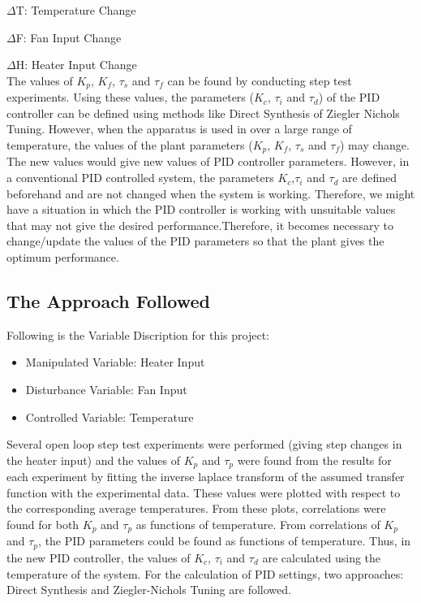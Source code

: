 $\Delta$T: Temperature Change

$\Delta$F: Fan Input Change

$\Delta$H: Heater Input Change\\

The values of $K_p$, $K_f$, $\tau_s$ and $\tau_f$ can be found by conducting step test experiments. Using these values, the parameters ($K_c$,  $\tau_i$ and  $\tau_d$) of the PID controller can be defined using methods like Direct Synthesis of Ziegler Nichols Tuning.
However, when the apparatus is used in over a large range of temperature, the values of the plant parameters ($K_p$, $K_f$, $\tau_s$ and $\tau_f$) may change. The new values would give new values of PID controller parameters. However, in a conventional PID controlled system, the parameters $K_c$,$\tau_i$ and $\tau_d$ are defined beforehand and are not changed when the system is working. Therefore, we might have a situation in which the PID controller is working with unsuitable values that may not give the desired performance.Therefore, it becomes necessary to change/update the values of the PID parameters so that the plant gives the optimum performance.
\newpage
\subsection{The Approach Followed}
Following is the Variable Discription for this project:
\begin{itemize}
	\item  Manipulated Variable: Heater Input
	\item  Disturbance Variable: Fan Input
	\item  Controlled Variable: Temperature
\end{itemize}

Several open loop step test experiments were performed (giving step changes in the heater input) and the values of $K_p$ and $\tau_p$  were found from the results for each experiment by fitting the inverse laplace transform of the assumed transfer function with the experimental data. These values were plotted with respect to the corresponding average temperatures. From these plots, correlations were found for both $K_p$ and $\tau_p$ as functions of temperature. 
From correlations of  $K_p$ and $\tau_p$, the PID parameters could be found as functions of temperature. Thus, in the new PID controller, the values of $K_c$, $\tau_i$ and $\tau_d$ are calculated using the temperature of the system. For the calculation of PID settings, two approaches: Direct Synthesis and Ziegler-Nichols Tuning are followed.



